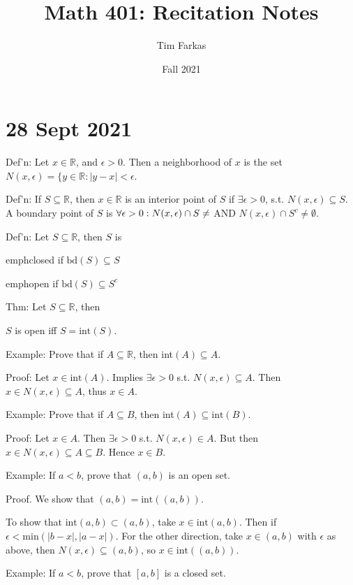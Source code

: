 \documentclass{report}
\title{Math 401: Recitation Notes}
\author{Tim Farkas}
\date{Fall 2021}
\begin{document}
\maketitle

\section*{28 Sept 2021}

Def'n: Let $x \in \mathbb{R}$, and $\epsilon > 0$. Then a neighborhood of $x$ is the set $N(x, \epsilon) = \{y \in \mathbb{R}: \left|y - x\right| < \epsilon$. 

Def'n: If $S \subseteq \mathbb{R}$, then $x \in \mathbb{R}$ is an interior point of $S$ if $\exists \epsilon > 0$, s.t. $N(x, \epsilon) \subseteq S$. A boundary point of $S$ is $\forall \epsilon > 0: N(x, \epsilon) \cap S \neq \empty$ AND $N(x, \epsilon) \cap S^c \neq \emptyset$. 

Def'n: Let $S \subseteq \mathbb{R}$, then $S$ is 

emph{closed} if $\text{bd}(S) \subseteq S$

emph{open} if $\text{bd}(S) \subseteq S^c$

Thm: Let $S \subseteq \mathbb{R}$, then 

$S$ is open iff $S = \text{int}(S)$. 

Example: Prove that if $A \subseteq \mathbb{R}$, then int$(A) \subseteq A$. 

Proof: Let $x \in \text{int}(A)$. Implies $\exists \epsilon > 0$ s.t. $N(x, \epsilon) \subseteq A$. 
Then $x \in N(x, \epsilon) \subseteq A$, thus $x \in A$. 

Example: Prove that if $A \subseteq B$, then int$(A) \subseteq \text{int}(B)$. 

Proof: Let $x \in A$. Then $\exists \epsilon > 0$ s.t. $N(x, \epsilon) \in A$. But then $x \in N(x, \epsilon) \subseteq A \subseteq B$. 
Hence $x \in B$. 

Example: If $a < b$, prove that $(a, b)$ is an open set. 

Proof. We show that $(a, b) = \text{int}((a, b))$.

To show that $\text{int}(a, b) \subset (a, b)$, take $x \in \text{int}(a, b)$. Then if $\epsilon < \text{min}(\left|b-x\right|, \left|a-x\right|)$.  For the other direction, take $x \in (a, b)$ with $\epsilon$ as above, then $N(x, \epsilon) \subseteq (a, b)$, so $x \in \text{int}((a, b))$. 

Example: If $a < b$, prove that $[a, b]$ is a closed set. 
\end{document}
